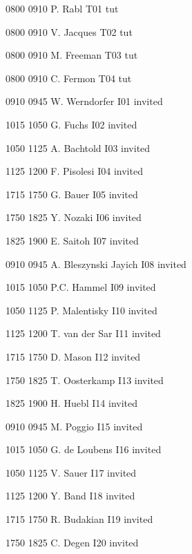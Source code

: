 
         {0800} {0910} {P. Rabl    } {} {T01} {tut}
        
         {0800} {0910} {V. Jacques} {} {T02} {tut}
        
         {0800} {0910} {M. Freeman} {} {T03} {tut}
        
         {0800} {0910} {C. Fermon} {} {T04} {tut}
        
         {0910} {0945} {W. Werndorfer} {} {I01} {invited}
        
         {1015} {1050} {G. Fuchs} {} {I02} {invited}
        
         {1050} {1125} {A. Bachtold} {} {I03} {invited}
        
         {1125} {1200} {F. Pisolesi} {} {I04} {invited}
        
         {1715} {1750} {G. Bauer} {} {I05} {invited}
        
         {1750} {1825} {Y. Nozaki} {} {I06} {invited}
        
         {1825} {1900} {E. Saitoh} {} {I07} {invited}
        
         {0910} {0945} {A. Bleszynski Jayich} {} {I08} {invited}
        
         {1015} {1050} {P.C. Hammel} {} {I09} {invited}
        
         {1050} {1125} {P. Malentisky} {} {I10} {invited}
        
         {1125} {1200} {T. van der Sar} {} {I11} {invited}
        
         {1715} {1750} {D. Mason} {} {I12} {invited}
        
         {1750} {1825} {T. Oosterkamp} {} {I13} {invited}
        
         {1825} {1900} {H. Huebl} {} {I14} {invited}
        
         {0910} {0945} {M. Poggio} {} {I15} {invited}
        
         {1015} {1050} {G. de Loubens} {} {I16} {invited}
        
         {1050} {1125} {V. Sauer} {} {I17} {invited}
        
         {1125} {1200} {Y. Band} {} {I18} {invited}
        
         {1715} {1750} {R. Budakian} {} {I19} {invited}
        
         {1750} {1825} {C. Degen} {} {I20} {invited}
        
